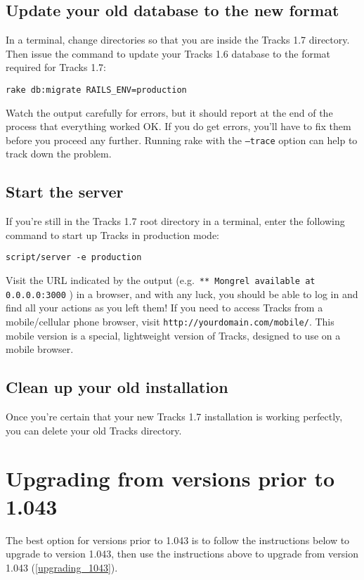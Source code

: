 \documentclass[10pt,twoside]{memoir}
\begin{document}
\subsection{Update your old database to the new format}
\label{rake_upgrade}

In a terminal, change directories so that you are inside the Tracks 1.7 directory. Then issue the command to update your Tracks 1.6 database to the format required for Tracks 1.7:


\texttt{rake db:migrate RAILS\_ENV=production}


Watch the output carefully for errors, but it should report at the end of the process that everything worked OK. If you do get errors, you'll have to fix them before you proceed any further. Running rake with the \texttt{--trace} option can help to track down the problem.


\subsection{Start the server}
\label{startserver_upgrade}

If you're still in the Tracks 1.7 root directory in a terminal, enter the following command to start up Tracks in production mode:


\texttt{script/server -e production}


Visit the URL indicated by the output (e.g.\ \texttt{** Mongrel available at 0.0.0.0:3000}
) in a browser, and with any luck, you should be able to log in and find all your actions as you left them! If you need to access Tracks from a mobile/cellular phone browser, visit \texttt{http://yourdomain.com/mobile/}. This mobile version is a special, lightweight version of Tracks, designed to use on a mobile browser.


\subsection{Clean up your old installation}
\label{cleanup_upgrade}

Once you're certain that your new Tracks 1.7 installation is working perfectly, you can delete your old Tracks directory.


\section{Upgrading from versions prior to 1.043}
\label{upgradingfromversionspriorto1.043}

The best option for versions prior to 1.043 is to follow the instructions below to upgrade to version 1.043, then use the instructions above to upgrade from version 1.043 (\autoref{upgrading_1043}).
\end{document}
